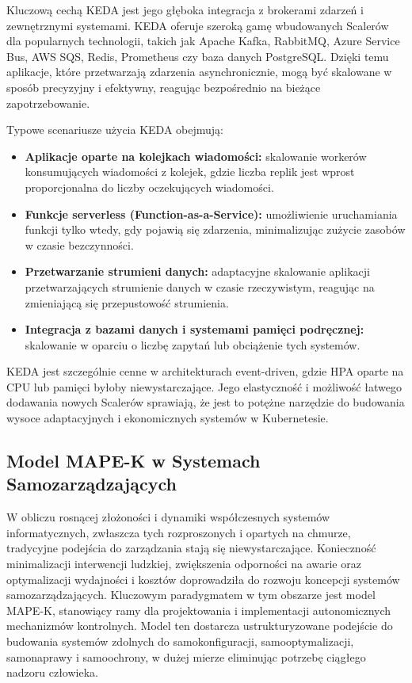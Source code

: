 Kluczową cechą KEDA jest jego głęboka integracja z brokerami zdarzeń i zewnętrznymi systemami. KEDA oferuje szeroką gamę wbudowanych Scalerów dla popularnych technologii, takich jak Apache Kafka, RabbitMQ, Azure Service Bus, AWS SQS, Redis, Prometheus czy baza danych PostgreSQL. Dzięki temu aplikacje, które przetwarzają zdarzenia asynchronicznie, mogą być skalowane w sposób precyzyjny i efektywny, reagując bezpośrednio na bieżące zapotrzebowanie.

Typowe scenariusze użycia KEDA obejmują:
\begin{itemize}
    \item \textbf{Aplikacje oparte na kolejkach wiadomości:} skalowanie workerów konsumujących wiadomości z kolejek, gdzie liczba replik jest wprost proporcjonalna do liczby oczekujących wiadomości.
    \item \textbf{Funkcje serverless (Function-as-a-Service):} umożliwienie uruchamiania funkcji tylko wtedy, gdy pojawią się zdarzenia, minimalizując zużycie zasobów w czasie bezczynności.
    \item \textbf{Przetwarzanie strumieni danych:} adaptacyjne skalowanie aplikacji przetwarzających strumienie danych w czasie rzeczywistym, reagując na zmieniającą się przepustowość strumienia.
    \item \textbf{Integracja z bazami danych i systemami pamięci podręcznej:} skalowanie w oparciu o liczbę zapytań lub obciążenie tych systemów.
\end{itemize}
KEDA jest szczególnie cenne w architekturach event-driven, gdzie HPA oparte na CPU lub pamięci byłoby niewystarczające. Jego elastyczność i możliwość łatwego dodawania nowych Scalerów sprawiają, że jest to potężne narzędzie do budowania wysoce adaptacyjnych i ekonomicznych systemów w Kubernetesie.




\subsection{Model MAPE-K w Systemach Samozarządzających}
W obliczu rosnącej złożoności i dynamiki współczesnych systemów informatycznych, zwłaszcza tych rozproszonych i opartych na chmurze, tradycyjne podejścia do zarządzania stają się niewystarczające. Konieczność minimalizacji interwencji ludzkiej, zwiększenia odporności na awarie oraz optymalizacji wydajności i kosztów doprowadziła do rozwoju koncepcji systemów samozarządzających. Kluczowym paradygmatem w tym obszarze jest model MAPE-K, stanowiący ramy dla projektowania i implementacji autonomicznych mechanizmów kontrolnych. Model ten dostarcza ustrukturyzowane podejście do budowania systemów zdolnych do samokonfiguracji, samooptymalizacji, samonaprawy i samoochrony, w dużej mierze eliminując potrzebę ciągłego nadzoru człowieka.

